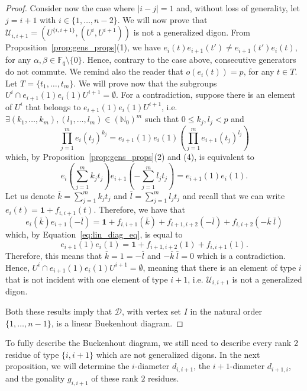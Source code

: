 \documentclass[11pt,letterpaper]{amsart}
\newcommand{\DD}{\mathcal{D}}
\newcommand{\FF}{\mathbb{F}}
\newcommand{\UU}{\mathcal{U}}
\begin{document}
\begin{proof}
Consider now the case where $|i-j|=1$ and, without loss of generality, let $j=i+1$ with $i\in \{1,\ldots,n-2\}$. 
We will now prove that $\UU_{i,i+1}=(U^{\{i,i+1\}},(U^i,U^{i+1}))$ is not a generalized digon. From Proposition~\ref{prop:gens_props}(1),  we have $e_{i}(t)e_{i+1}(t')\neq e_{i+1}(t')e_{i}(t)$, for any $\alpha,\beta\in \FF_q\setminus\{0\}$.
Hence, contrary to the case above, consecutive generators do not commute. 
We remind also the reader that $o(e_i(t))=p$, for any $t\in T$.
Let $T=\{t_1,\ldots,t_m\}$. 
We will prove now that the subgroups $U^i \cap e_{i+1}(1)e_{i}(1)U^{i+1}=\emptyset$.
For a contradiction, suppose there is an element of $U^i$ that belongs to $e_{i+1}(1)e_{i}(1)U^{i+1}$, i.e. $\exists (k_1,\ldots,k_m),(l_1,\ldots,l_m)\in (\mathbb{N}_0)^m$ such that $0\leq k_j,l_j<p$ and 
$$\prod _{j=1}^m e_{i}(t_j)^{k_j} =e_{i+1}(1)e_{i}(1)\left(\prod _{j=1}^m e_{i+1}(t_j)^{l_j}\right)$$
 which, by Proposition~\ref{prop:gens_props}(2) and (4), is equivalent to 
\begin{equation}\label{eq:lin_diag_eq} e_{i}\left(\sum_{j=1}^mk_jt_j\right)e_{i+1}\left(-\sum _{j=1}^ml_jt_j\right)=e_{i+1}(1)e_{i}(1).  
\end{equation}
Let us denote $\overline{k} = \sum_{j=1}^mk_jt_j$ and $\overline{l}=\sum _{j=1}^ml_jt_j$ and 
recall that we can write $e_i(t)=\mathbf{1}+f_{i,i+1}(t)$.
Therefore, we have that 
$$
e_{i}(\overline{k})e_{i+1}(-\overline{l})=\mathbf{1}+f_{i,i+1}(\overline{k})+f_{i+1,i+2}(-\overline{l})
+f_{i,i+2}(-\overline{k}\ \overline{l})
$$
which, by Equation~\ref{eq:lin_diag_eq}, is equal to
$$
e_{i+1}(1)e_{i}(1) =\mathbf{1}+f_{i+1,i+2}\left(1\right)+f_{i,i+1}\left(1\right).
$$
Therefore, this means that $\overline{k}=1=-\overline{l}$
and $-\overline{k}\ \overline{l}=0$ which is a contradiction. Hence, $U^i\cap e_{i+1}(1)e_{i}(1)U^{i+1}=\emptyset$, meaning that there is an element of type $i$ that is not incident with one element of type $i+1$, i.e. $\mathcal{U}_{i,i+1}$ is not a generalized digon.

Both these results imply that $\DD$, with vertex set $I$ in the natural order $\{1,\ldots,n-1\}$, is a linear Buekenhout diagram.

\end{proof}

To fully describe the Buekenhout diagram, we still need to describe every rank 2 residue of type $\{i,i+1\}$ which are not generalized digons. In the next proposition, we will determine the $i$-diameter $d_{i,i+1}$, the $i+1$-diameter $d_{i+1,i}$, and the gonality $g_{i,i+1}$ of these rank $2$ residues.
\end{document}
